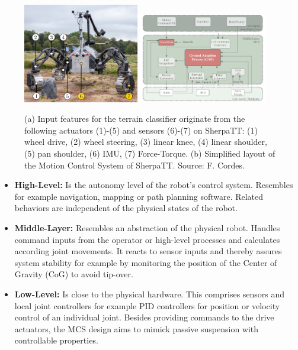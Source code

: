 \documentclass{article}
\begin{document}
\begin{figure}[!htbp]
       {
           \includegraphics[width=0.45\textwidth]{../figures/terrain_classifier_sensor_inputs.png}
       }
       {
           \includegraphics[width=0.5\textwidth]{../figures/MCS-Structure.pdf}
       }
   \caption{\label{fig:Loco}(a) Input features for the terrain classifier originate from the following actuators (1)-(5) and sensors (6)-(7) on SherpaTT: (1) wheel drive, (2) wheel steering, (3) linear knee, (4) linear shoulder, (5) pan shoulder, (6) IMU, (7) Force-Torque. (b) Simplified layout of the Motion Control System of SherpaTT. Source: F. Cordes.}
\end{figure}

\begin{itemize}
    \item \textbf{High-Level:} Is the autonomy level of the robot’s control system. Resembles for example navigation, mapping or path planning software. Related behaviors are independent of the physical states of the robot.
    \item \textbf{Middle-Layer:} Resembles an abstraction of the physical robot. Handles command inputs from the operator or high-level processes and calculates according joint movements. It reacts to sensor inputs and thereby assures system stability for example by monitoring the position of the Center of Gravity (CoG) to avoid tip-over.
    \item \textbf{Low-Level:} Is close to the physical hardware. This comprises sensors and local joint controllers for example PID controllers for position or velocity control of an individual joint. Besides providing commands to the drive actuators, the MCS design aims to mimick passive suspension with controllable properties.
\end{itemize}
\end{document}
